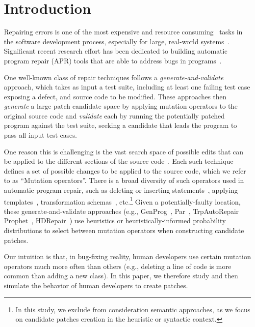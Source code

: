 \documentclass[conference]{IEEEtran}
\begin{document}
\section{Introduction} \label{introduction}
Repairing errors is one of the most expensive\cite{Tassey02,Britton13} and 
resource consuming~\cite{Weiss07} tasks in 
the software development process, especially for large, real-world systems~\cite{Liblit03,Anvik05}.
%
Significant recent research effort has been dedicated to
building automatic program repair (APR) tools that are able to address
bugs in 
programs~\cite{legoues12,kim2013,Weimer13,fan15SPR,long16proph,debroy10,perkins09,wei10}. 

One well-known class of repair techniques follows a 
\emph{generate-and-validate} approach, which takes as input a test suite, 
including at
least one failing test case exposing
a defect, and source code to be 
modified.  These approaches then \emph{generate} a large patch candidate space 
by applying 
mutation operators to the original source code and \emph{validate} each by
running the potentially patched program against the test suite, seeking a candidate that
leads the program to pass all input test cases. 

One reason this is challenging is the vast search space of possible 
edits that can be applied to the different sections of the source 
code~\cite{long16}. Each such technique defines  a set of possible changes to be
applied to the source code, which we refer to as ``Mutation operators''. 
There is a broad diversity of such operators used in automatic program repair, such as deleting or inserting 
statements~\cite{legoues12}, applying templates~\cite{kim2013}, transformation 
schemas~\cite{fan15SPR}, etc.\footnote{In this study, we exclude 
from 
consideration semantic approaches, as we focus on
candidate patches creation in the heuristic or syntactic context.} 
Given a potentially-faulty location, these
generate-and-validate approaches (e.g., GenProg~\cite{legoues12}, 
Par~\cite{kim2013}, TrpAutoRepair~\cite{Qi13TrpAutoR}
Prophet~\cite{long16proph}, HDRepair~\cite{xuan16}) use heuristics or
heuristically-informed probability distributions to select between
mutation operators
when constructing candidate patches.

Our intuition is that, in bug-fixing reality, human developers use certain mutation operators 
much more often than 
others (e.g., deleting a line of code is more common than adding a
new class). In this paper, we therefore study and then simulate the behavior of human
developers to create patches.
 
\end{document}
